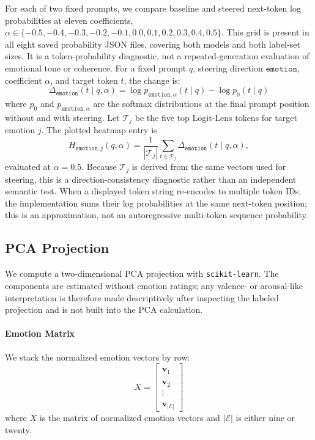 For each of two fixed prompts, we compare baseline and steered next-token log probabilities at eleven coefficients,
$\alpha\in\{-0.5,-0.4,-0.3,-0.2,-0.1,0.0,0.1,0.2,0.3,0.4,0.5\}$. This grid is present in all eight saved probability JSON files,
covering both models and both label-set sizes. It is a token-probability diagnostic, not a repeated-generation evaluation of
emotional tone or coherence. For a fixed prompt $q$, steering direction $\mathtt{emotion}$, coefficient
$\alpha$, and target token $t$, the change is:
\begin{equation}
    \Delta_{\mathtt{emotion}}(t\mid q,\alpha)=\log p_{\mathtt{emotion},\alpha}(t\mid q)-\log p_0(t\mid q)
    \label{eqtn:deltalog-prob}
\end{equation}
where $p_0$ and $p_{\mathtt{emotion},\alpha}$ are the softmax distributions at the final prompt position without and with steering. Let $\mathcal{T}_j$ be 
the five top Logit-Lens tokens for target emotion $j$. The plotted heatmap entry is
\begin{equation}
    H_{\mathtt{emotion},j}(q,\alpha)=\frac{1}{|\mathcal{T}_j|}\sum_{t\in\mathcal{T}_j}\Delta_{\mathtt{emotion}}(t\mid q,\alpha),
    \label{eqtn:deltalog-heatmap}
\end{equation}
evaluated at $\alpha=0.5$. Because $\mathcal{T}_j$ is derived from the same vectors used for steering, this is a direction-consistency 
diagnostic rather than an independent semantic test. When a displayed token string re-encodes to multiple token IDs, the implementation 
sums their log probabilities at the same next-token position; this is an approximation, not an autoregressive multi-token sequence probability.

\subsection{PCA Projection}
We compute a two-dimensional PCA projection with \texttt{scikit-learn}. The components are estimated without emotion ratings; any valence- or 
arousal-like interpretation is therefore made descriptively after inspecting the labeled projection and is not built into the PCA calculation.

\paragraph{Emotion Matrix} We stack the normalized emotion vectors by row:
\begin{equation}
    X=
    \begin{bmatrix}
        \mathbf{\hat{v}}_1 \\
        \mathbf{\hat{v}}_2 \\
        \vdots \\
        \mathbf{\hat{v}}_{|\mathcal{E}|}
    \end{bmatrix}
    \label{eqtn:pca-emotionMatrix}
\end{equation}
where $X$ is the matrix of normalized emotion vectors and $|\mathcal{E}|$ is either nine or twenty.


